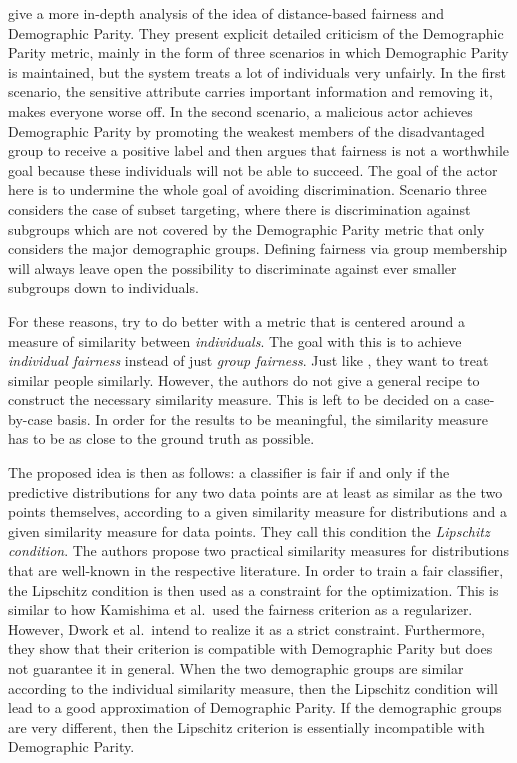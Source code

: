 \citet{dwork2012fairness} give a more in-depth analysis
of the idea of distance-based fairness and Demographic Parity.
They present explicit detailed criticism of the Demographic Parity metric,
mainly in the form of three scenarios in which Demographic Parity is maintained,
but the system treats a lot of individuals very unfairly.
In the first scenario, the sensitive attribute carries important information
and removing it, makes everyone worse off.
In the second scenario, a malicious actor achieves Demographic Parity
by promoting the weakest members of the disadvantaged group to receive a positive label
and then argues that fairness is not a worthwhile goal
because these individuals will not be able to succeed.
The goal of the actor here is to undermine the whole goal of avoiding discrimination.
Scenario three considers the case of subset targeting,
where there is discrimination against subgroups
which are not covered by the Demographic Parity metric
that only considers the major demographic groups.
Defining fairness via group membership will always leave open the possibility
to discriminate against ever smaller subgroups down to individuals.

For these reasons, \citet{dwork2012fairness} try to do better with a metric
that is centered around a measure of similarity between \emph{individuals}.
The goal with this is to achieve \emph{individual fairness} instead of just \emph{group fairness}.
Just like \citet{luong2011k}, they want to treat similar people similarly.
However, the authors do not give a general recipe to construct the necessary similarity measure.
This is left to be decided on a case-by-case basis.
In order for the results to be meaningful,
the similarity measure has to be as close to the ground truth as possible.

The proposed idea is then as follows: a classifier is fair
if and only if the predictive distributions for any two data points
are at least as similar as the two points themselves,
according to a given similarity measure for distributions
and a given similarity measure for data points.
They call this condition the \emph{Lipschitz condition}.
The authors propose two practical similarity measures for distributions
that are well-known in the respective literature.
In order to train a fair classifier,
the Lipschitz condition is then used as a constraint for the optimization.
This is similar to how Kamishima et al.~used the fairness criterion as a regularizer.
However, Dwork et al.~intend to realize it as a strict constraint.
Furthermore, they show that their criterion is compatible with Demographic Parity
but does not guarantee it in general.
When the two demographic groups are similar according to the individual similarity measure,
then the Lipschitz condition will lead to a good approximation of Demographic Parity.
If the demographic groups are very different,
then the Lipschitz criterion is essentially incompatible with Demographic Parity.

